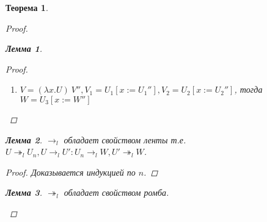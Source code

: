 \documentclass[10pt,twoside]{article}
\theoremstyle{plain}
\newtheorem{thm}{Теорема}
\newtheorem{lemma}{Лемма}
\theoremstyle{definition}
\begin{document}
\begin{thm}
\begin{proof}
\begin{lemma}
\begin{proof}
\begin{enumerate}
\begin{enumerate}
                \begin{center}
                \end{center}
            \end{enumerate}
          \item $V = (\lambda x.U)\ V'',V_1 = U_1[x:=U_1''], V_2 = U_2[x:=U_2'']$, тогда $W=U_3[x:=W'']$
        \end{enumerate}
      \end{proof}
    \end{lemma}
    \begin{lemma}
      $\to_l$ обладает свойством ленты т.е. $U\twoheadrightarrow_l U_n, U\to_l U':U_n\to_l W, U'\twoheadrightarrow_l W$.
      \begin{proof}
        Доказывается индукцией по $n$.
      \end{proof}
    \end{lemma}
    \begin{lemma}
      $\twoheadrightarrow_l$ обладает свойством ромба.


\end{lemma}
\end{proof}
\end{thm}
\end{document}
